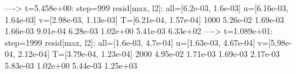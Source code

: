 {%
 ----> t=5.458e+00: step=999 resid[max, l2]: all=[6.2e-03, 1.6e-03] u=[6.16e-03, 1.64e-03] v=[2.98e-03, 1.13e-03] T=[6.21e-04, 1.57e-04]
      1000 5.26e-02 1.69e-03 1.66e-03 9.01e-04 6.28e-03  1.02e+00 5.41e-03 6.33e+02 
 ----> t=1.089e+01: step=1999 resid[max, l2]: all=[1.6e-03, 4.7e-04] u=[1.63e-03, 4.67e-04] v=[5.98e-04, 2.12e-04] T=[3.79e-04, 1.23e-04]
      2000 4.95e-02 1.71e-03 1.69e-03 2.17e-03 5.83e-03  1.02e+00 5.44e-03 1.25e+03 

% 
% 
% 
% 
% 
% 
% 


} %
